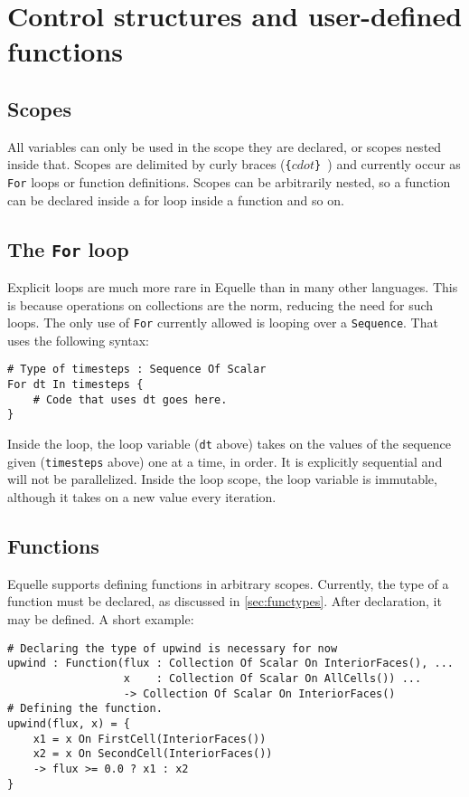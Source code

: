 \documentclass[11pt]{article}
\newcommand{\code}[1]{\texttt{#1}}
\begin{document}
\section{Control structures and user-defined functions}

\subsection{Scopes}

All variables can only be used in the scope they are declared, or scopes nested inside
that. Scopes are delimited by curly braces (\code{\{$cdot$\} }) and currently occur as
\code{For} loops or function definitions. Scopes can be arbitrarily nested, so a function
can be declared inside a for loop inside a function and so on.

\subsection{The \code{For} loop}

Explicit loops are much more rare in Equelle than in many other languages. This is because
operations on collections are the norm, reducing the need for such loops. The only use of
\code{For} currently allowed is looping over a \code{Sequence}. That uses the following
syntax:

\begin{verbatim}
# Type of timesteps : Sequence Of Scalar
For dt In timesteps {
    # Code that uses dt goes here.
}
\end{verbatim}

Inside the loop, the loop variable (\code{dt} above) takes on the values of the sequence
given (\code{timesteps} above) one at a time, in order. It is explicitly sequential and
will not be parallelized. Inside the loop scope, the loop variable is immutable, although
it takes on a new value every iteration.

\subsection{Functions}

Equelle supports defining functions in arbitrary scopes. Currently, the type of a function
must be declared, as discussed in \ref{sec:functypes}. After declaration, it may be
defined. A short example:

\begin{verbatim}
# Declaring the type of upwind is necessary for now
upwind : Function(flux : Collection Of Scalar On InteriorFaces(), ...
                  x    : Collection Of Scalar On AllCells()) ...
                  -> Collection Of Scalar On InteriorFaces()
# Defining the function.
upwind(flux, x) = {
    x1 = x On FirstCell(InteriorFaces())
    x2 = x On SecondCell(InteriorFaces())
    -> flux >= 0.0 ? x1 : x2
}
\end{verbatim}
\end{document}
